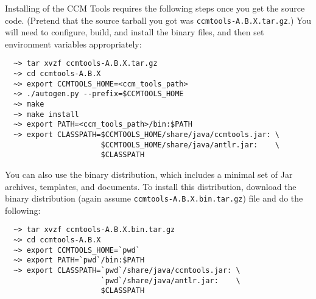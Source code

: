 Installing of the CCM Tools requires the following steps once you get the source
code. (Pretend that the source tarball you got was {\tt ccmtools-A.B.X.tar.gz}.)
You will need to configure, build, and install the binary files, and then set
environment variables appropriately:
\begin{small}
\begin{verbatim}
  ~> tar xvzf ccmtools-A.B.X.tar.gz
  ~> cd ccmtools-A.B.X
  ~> export CCMTOOLS_HOME=<ccm_tools_path>
  ~> ./autogen.py --prefix=$CCMTOOLS_HOME
  ~> make
  ~> make install
  ~> export PATH=<ccm_tools_path>/bin:$PATH
  ~> export CLASSPATH=$CCMTOOLS_HOME/share/java/ccmtools.jar: \
                      $CCMTOOLS_HOME/share/java/antlr.jar:    \
                      $CLASSPATH
\end{verbatim}
\end{small}

You can also use the binary distribution, which includes a minimal set of Jar
archives, templates, and documents. To install this distribution, download the
binary distribution (again assume {\tt ccmtools-A.B.X.bin.tar.gz}) file and do
the following:
\begin{small}
\begin{verbatim}
  ~> tar xvzf ccmtools-A.B.X.bin.tar.gz
  ~> cd ccmtools-A.B.X
  ~> export CCMTOOLS_HOME=`pwd`
  ~> export PATH=`pwd`/bin:$PATH
  ~> export CLASSPATH=`pwd`/share/java/ccmtools.jar: \
                      `pwd`/share/java/antlr.jar:    \
                      $CLASSPATH
\end{verbatim}
\end{small}

